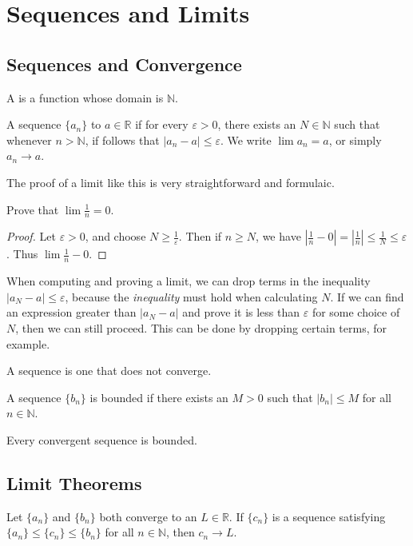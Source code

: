 \chapter{Sequences and Limits}
\section{Sequences and Convergence}
\begin{definition}
A  is a function whose domain is $\mathbb{N}$. 
\end{definition}
\begin{definition}
A sequence $\{a_n\}$  to $a \in \mathbb{R}$ if for every $\varepsilon > 0$, there exists an $N \in \mathbb{N}$ such that whenever $n > \mathbb{N}$, if follows that $|a_n - a| \leq \varepsilon$. We write $\lim a_n = a$, or simply $a_n \rightarrow a$. 
\end{definition}
The proof of a limit like this is very straightforward and formulaic. 
\begin{example}
Prove that $\lim \frac{1}{n} = 0$. 
\end{example}
\begin{proof}
Let $\varepsilon >0$, and choose $N \geq \frac{1}{\varepsilon}$. Then if $n \geq N$, we have $|\frac{1}{n}-0| = |\frac{1}{n}| \leq \frac{1}{N} \leq \varepsilon$. Thus $\lim \frac{1}{n} - 0$. 
\end{proof}
When computing and proving a limit, we can drop terms in the inequality $|a_N - a| \leq \varepsilon$, because the \emph{inequality} must hold when calculating $N$. If we can find an expression greater than $|a_N - a|$ and prove it is less than $\varepsilon$ for some choice of $N$, then we can still proceed. This can be done by dropping certain terms, for example. 

\begin{definition}
A  sequence is one that does not converge. 
\end{definition}

\begin{definition}
A sequence $\{b_n\}$ is bounded if there exists an $M > 0$ such that $|b_n| \leq M$ for all $n \in \mathbb{N}$. 
\end{definition}

\begin{theorem}
Every convergent sequence is bounded. 
\end{theorem}

\section{Limit Theorems}
\begin{theorem}
Let $\{a_n\}$ and $\{b_n\}$ both converge to an $L \in \mathbb{R}$. If $\{c_n\}$ is a sequence satisfying $\{a_n\} \leq \{c_n\} \leq \{b_n\}$ for all $n \in \mathbb{N}$, then $c_n \rightarrow L$. 
\end{theorem}

